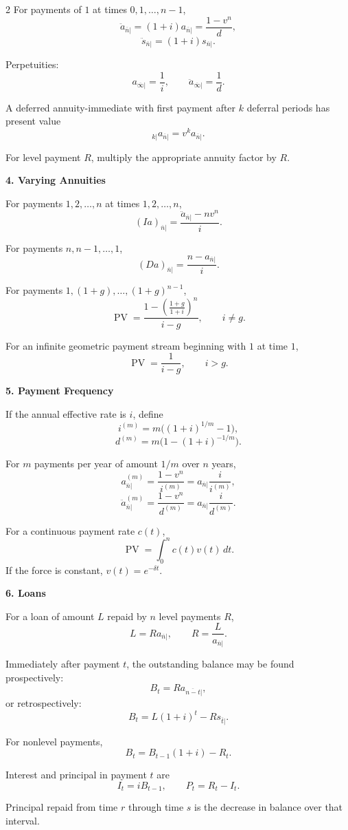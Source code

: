 \documentclass[10pt]{article}
\newcommand{\sect}[1]{%
  \vspace{4pt}%
  \noindent\colorbox{softgreen}{\parbox{\dimexpr\linewidth-2\fboxsep\relax}{\color{deepgreen}\bfseries #1}}%
  \vspace{3pt}%
}
\newcommand{\ann}[1]{a_{\overline{#1}|}}
\newcommand{\annDue}[1]{\ddot{a}_{\overline{#1}|}}
\newcommand{\acc}[1]{s_{\overline{#1}|}}
\newcommand{\accDue}[1]{\ddot{s}_{\overline{#1}|}}
\newcommand{\PV}{\operatorname{PV}}
\begin{document}
\begin{multicols}{2}
For payments of $1$ at times $0,1,\ldots,n-1$,
\[ \annDue{n}=(1+i)\ann{n}=\frac{1-v^n}{d}, \]
\[ \accDue{n}=(1+i)\acc{n}. \]

Perpetuities:
\[ \ann{\infty}=\frac{1}{i}, \qquad \annDue{\infty}=\frac{1}{d}. \]

A deferred annuity-immediate with first payment after $k$ deferral periods has present value
\[ {}_{k|}\ann{n}=v^k\ann{n}. \]

For level payment $R$, multiply the appropriate annuity factor by $R$.

\sect{4. Varying Annuities}

For payments $1,2,\ldots,n$ at times $1,2,\ldots,n$,
\[ (I\!a)_{\overline{n}|}=\frac{\annDue{n}-nv^n}{i}. \]

For payments $n,n-1,\ldots,1$,
\[ (D\!a)_{\overline{n}|}=\frac{n-\ann{n}}{i}. \]

For payments $1,(1+g),\ldots,(1+g)^{n-1}$,
\[ \PV=\frac{1-\left(\frac{1+g}{1+i}\right)^n}{i-g}, \qquad i\neq g. \]

For an infinite geometric payment stream beginning with $1$ at time $1$,
\[ \PV=\frac{1}{i-g}, \qquad i>g. \]

\sect{5. Payment Frequency}

If the annual effective rate is $i$, define
\[ i^{(m)}=m\big((1+i)^{1/m}-1\big), \]
\[ d^{(m)}=m\big(1-(1+i)^{-1/m}\big). \]

For $m$ payments per year of amount $1/m$ over $n$ years,
\[ \ann{n}^{(m)}=\frac{1-v^n}{i^{(m)}}=\ann{n}\frac{i}{i^{(m)}}, \]
\[ \annDue{n}^{(m)}=\frac{1-v^n}{d^{(m)}}=\ann{n}\frac{i}{d^{(m)}}. \]

For a continuous payment rate $c(t)$,
\[ \PV=\int_0^n c(t)v(t)\,dt. \]
If the force is constant, $v(t)=e^{-\delta t}$.

\sect{6. Loans}

For a loan of amount $L$ repaid by $n$ level payments $R$,
\[ L=R\ann{n}, \qquad R=\frac{L}{\ann{n}}. \]

Immediately after payment $t$, the outstanding balance may be found prospectively:
\[ B_t=R\ann{n-t}, \]
or retrospectively:
\[ B_t=L(1+i)^t-R\acc{t}. \]

For nonlevel payments,
\[ B_{t}=B_{t-1}(1+i)-R_t. \]

Interest and principal in payment $t$ are
\[ I_t=iB_{t-1}, \qquad P_t=R_t-I_t. \]

Principal repaid from time $r$ through time $s$ is the decrease in balance over that interval.


\end{multicols}
\end{document}
